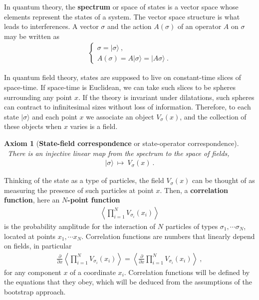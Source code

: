 \documentclass[12pt, a4paper, notitlepage, twoside]{report}
\numberwithin{equation}{section}
\theoremstyle{break}
\newtheorem{hyp}{Axiom}[chapter]
\begin{document}
In quantum theory, the \textbf{\boldmath spectrum} or space of states is a vector space whose elements represent the states of a system.
The vector space structure is what leads to interferences.
A vector $\sigma$ and the action $A(\sigma)$ of an operator $A$ on $\sigma$ may be written as 
\begin{align}
\left\{\begin{array}{l} 
 \sigma = |\sigma\rangle\ , \\ A(\sigma) = A|\sigma\rangle = |A\sigma\rangle\ .
\end{array}\right. 
\end{align}

In quantum field theory, states are supposed to live on constant-time slices of space-time. If space-time is Euclidean, we can take such slices to be spheres surrounding any point $x$. If the theory is invariant under dilatations, such spheres can contract to infinitesimal sizes without loss of information. Therefore, to each state $|\sigma\rangle$ and each point $x$ we associate an object $V_\sigma(x)$, and the collection of these objects when $x$ varies is a field. 

\begin{hyp}[\textbf{\boldmath State-field correspondence} or state-operator correspondence]
~\label{ax:sfc}
 There is an injective linear map from the spectrum to the space of fields,
 \begin{align}
 |\sigma \rangle  \ \mapsto \ V_\sigma(x)\ .
\end{align}
\end{hyp} 
\noindent
Thinking of the state as a type of particles, the field $V_\sigma(x)$ can be thought of as measuring the presence of such particles at point $x$.
Then, a \textbf{\boldmath correlation function}, here an \textbf{\boldmath $N$-point function}
\begin{align}
\left\langle \prod_{i=1}^N V_{\sigma_i}(x_i)\right\rangle
\label{pva}
\end{align}
is the probability amplitude for the interaction of $N$ particles of types $\sigma_1,\cdots \sigma_N$, located at points $x_1,\cdots x_N$. 
Correlation functions are numbers that linearly depend on fields, in particular 
\begin{align}
 \frac{\partial}{\partial x} \left\langle \prod_{i=1}^N V_{\sigma_i}(x_i)\right\rangle = \left\langle \frac{\partial}{\partial x} \prod_{i=1}^N V_{\sigma_i}(x_i)\right\rangle\ ,
\end{align}
for any component $x$ of a coordinate $x_i$. 
Correlation functions will be defined by the equations that they obey, which will be deduced from the assumptions of the bootstrap approach.
\end{document}
